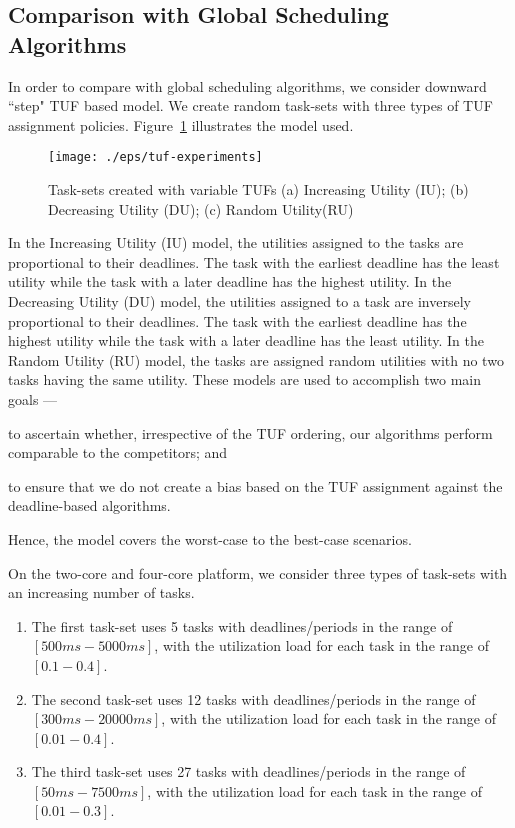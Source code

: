 \documentclass[12pt,dvips]{report}
\begin{document}
\subsection{Comparison with Global Scheduling Algorithms}

In order to compare with global scheduling algorithms, we consider downward ``step" TUF based model. We create random task-sets with three types of TUF assignment policies. Figure~\ref{fig:tuf-experiments} illustrates the model used. 

\begin{figure} [htb]
  \centering
  \texttt{[image: ./eps/tuf-experiments]}
  \caption{Task-sets created with variable TUFs (a) Increasing Utility (IU); (b) Decreasing Utility (DU); (c) Random Utility(RU)}
  \label{fig:tuf-experiments}
\end{figure}

In the Increasing Utility (IU) model, the utilities assigned to the tasks are proportional to their deadlines. The task with the earliest deadline has the least utility while the task with a later deadline has the highest utility. In the Decreasing Utility (DU) model, the utilities assigned to a task are inversely proportional to their deadlines. The task with the earliest deadline has the highest utility while the task with a later deadline has the least utility. In the Random Utility (RU) model, the tasks are assigned random utilities with no two tasks having the same utility. These models are used to accomplish two main goals ---
\begin{inparaenum}[(i)]
\item to ascertain whether, irrespective of the TUF ordering, our algorithms perform comparable to the competitors; and 
\item to ensure that we do not create a bias based on the TUF assignment against the deadline-based algorithms.
\end{inparaenum}
Hence, the model covers the worst-case to the best-case scenarios.

On the two-core and four-core platform, we consider three types of task-sets with an increasing number of tasks.
\begin{enumerate}
	\item The first task-set uses 5 tasks with deadlines/periods in the range of $[500ms-5000ms]$, 
		with the utilization load for each task in the range of $[0.1-0.4]$.
	\item The second task-set uses 12 tasks with deadlines/periods in the range of $[300ms-20000ms]$, 
		with the utilization load for each task in the range of $[0.01-0.4]$.
	\item The third task-set uses 27 tasks with deadlines/periods in the range of $[50ms-7500ms]$,
		with the utilization load for each task in the range of $[0.01-0.3]$. 
\end{enumerate}
\end{document}
